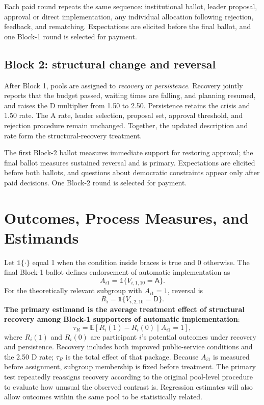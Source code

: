 \documentclass[11pt,a4paper]{article}
\newcommand{\Dproc}{\textsf{D}}
\newcommand{\Aproc}{\textsf{A}}
\newcommand{\ind}[1]{\mathbb{1}\{#1\}}
\begin{document}
Each paid round repeats the same sequence: institutional ballot, leader proposal, approval or direct implementation, any individual allocation following rejection, feedback, and rematching. Expectations are elicited before the final ballot, and one Block-1 round is selected for payment.

\subsection{Block 2: structural change and reversal}

After Block 1, pools are assigned to \emph{recovery} or \emph{persistence}. Recovery jointly reports that the budget passed, waiting times are falling, and planning resumed, and raises the \Dproc{} multiplier from 1.50 to 2.50. Persistence retains the crisis and 1.50 rate. The \Aproc{} rate, leader selection, proposal set, approval threshold, and rejection procedure remain unchanged. Together, the updated description and rate form the structural-recovery treatment.

The first Block-2 ballot measures immediate support for restoring approval; the final ballot measures sustained reversal and is primary. Expectations are elicited before both ballots, and questions about democratic constraints appear only after paid decisions. One Block-2 round is selected for payment.


\section{Outcomes, Process Measures, and Estimands}

Let \(\ind{\cdot}\) equal 1 when the condition inside braces is true and 0 otherwise. The final Block-1 ballot defines endorsement of automatic implementation as
\begin{equation}
A_{i1}=\ind{V_{i,1,10}=\Aproc}.
\end{equation}
For the theoretically relevant subgroup with $A_{i1}=1$, reversal is
\begin{equation}
R_i=\ind{V_{i,2,10}=\Dproc}.
\end{equation}
{\bf The primary estimand is the average treatment effect of structural recovery among Block-1 supporters of automatic implementation}:
\begin{equation}
\tau_R=\mathbb{E}[R_i(1)-R_i(0)\mid A_{i1}=1],
\end{equation}
where \(R_i(1)\) and \(R_i(0)\) are participant \(i\)'s potential outcomes under recovery and persistence. Recovery includes both improved public-service conditions and the 2.50 \Dproc{} rate; \(\tau_R\) is the total effect of that package. Because $A_{i1}$ is measured before assignment, subgroup membership is fixed before treatment. The primary test repeatedly reassigns recovery according to the original pool-level procedure to evaluate how unusual the observed contrast is. Regression estimates will also allow outcomes within the same pool to be statistically related.
\end{document}
